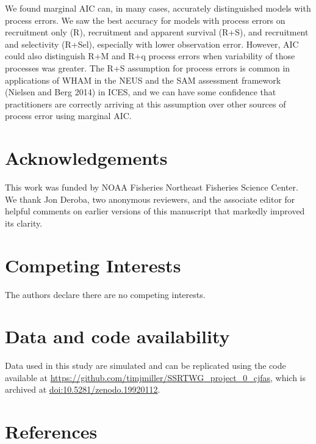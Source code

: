 \documentclass[
  12pt,
]{article}
\begin{document}
We found marginal AIC can, in many cases, accurately distinguished
models with process errors. We saw the best accuracy for models with
process errors on recruitment only (R), recruitment and apparent
survival (R+S), and recruitment and selectivity (R+Sel), especially with
lower observation error. However, AIC could also distinguish R+M and R+q
process errors when variability of those processes was greater. The R+S
assumption for process errors is common in applications of WHAM in the
NEUS and the SAM assessment framework (Nielsen and Berg 2014) in ICES,
and we can have some confidence that practitioners are correctly
arriving at this assumption over other sources of process error using
marginal AIC.

\section*{Acknowledgements}\label{acknowledgements}

This work was funded by NOAA Fisheries Northeast Fisheries Science
Center. We thank Jon Deroba, two anonymous reviewers, and the associate
editor for helpful comments on earlier versions of this manuscript that
markedly improved its clarity.

\section*{Competing Interests}\label{competing-interests}

The authors declare there are no competing interests.

\section*{Data and code availability}\label{data-and-code-availability}

Data used in this study are simulated and can be replicated using the
code available at
\url{https://github.com/timjmiller/SSRTWG_project_0_cjfas}, which is
archived at
\href{https://doi.org/10.5281/zenodo.19920112}{doi:10.5281/zenodo.19920112}.

\section*{References}\label{references}
\end{document}

